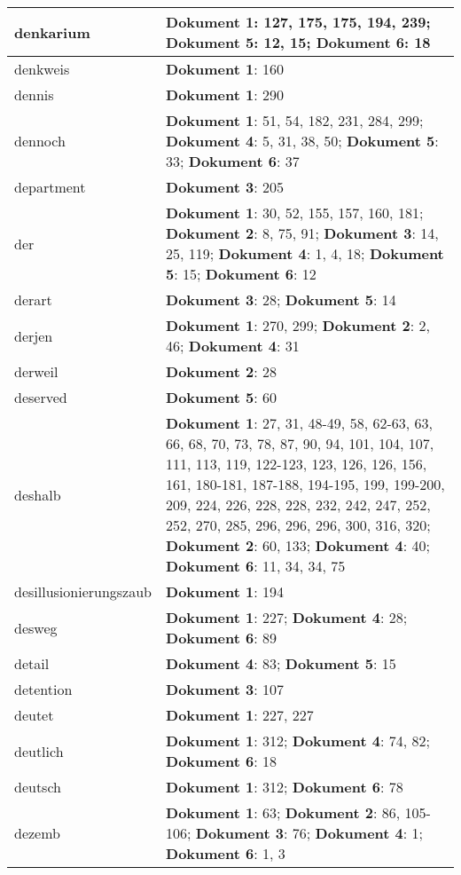 \documentclass[a5paper]{article}
\begin{document}
\begin{longtable}[l]{|l|p{3in}|}
\hline
denkarium & \textbf{Dokument 1}: 127, 175, 175, 194, 239; \textbf{Dokument 5}: 12, 15; \textbf{Dokument 6}: 18 \\
\hline
denkweis & \textbf{Dokument 1}: 160 \\
\hline
dennis & \textbf{Dokument 1}: 290 \\
\hline
dennoch & \textbf{Dokument 1}: 51, 54, 182, 231, 284, 299; \textbf{Dokument 4}: 5, 31, 38, 50; \textbf{Dokument 5}: 33; \textbf{Dokument 6}: 37 \\
\hline
department & \textbf{Dokument 3}: 205 \\
\hline
der & \textbf{Dokument 1}: 30, 52, 155, 157, 160, 181; \textbf{Dokument 2}: 8, 75, 91; \textbf{Dokument 3}: 14, 25, 119; \textbf{Dokument 4}: 1, 4, 18; \textbf{Dokument 5}: 15; \textbf{Dokument 6}: 12 \\
\hline
derart & \textbf{Dokument 3}: 28; \textbf{Dokument 5}: 14 \\
\hline
derjen & \textbf{Dokument 1}: 270, 299; \textbf{Dokument 2}: 2, 46; \textbf{Dokument 4}: 31 \\
\hline
derweil & \textbf{Dokument 2}: 28 \\
\hline
deserved & \textbf{Dokument 5}: 60 \\
\hline
deshalb & \textbf{Dokument 1}: 27, 31, 48-49, 58, 62-63, 63, 66, 68, 70, 73, 78, 87, 90, 94, 101, 104, 107, 111, 113, 119, 122-123, 123, 126, 126, 156, 161, 180-181, 187-188, 194-195, 199, 199-200, 209, 224, 226, 228, 228, 232, 242, 247, 252, 252, 270, 285, 296, 296, 296, 300, 316, 320; \textbf{Dokument 2}: 60, 133; \textbf{Dokument 4}: 40; \textbf{Dokument 6}: 11, 34, 34, 75 \\
\hline
desillusionierungszaub & \textbf{Dokument 1}: 194 \\
\hline
desweg & \textbf{Dokument 1}: 227; \textbf{Dokument 4}: 28; \textbf{Dokument 6}: 89 \\
\hline
detail & \textbf{Dokument 4}: 83; \textbf{Dokument 5}: 15 \\
\hline
detention & \textbf{Dokument 3}: 107 \\
\hline
deutet & \textbf{Dokument 1}: 227, 227 \\
\hline
deutlich & \textbf{Dokument 1}: 312; \textbf{Dokument 4}: 74, 82; \textbf{Dokument 6}: 18 \\
\hline
deutsch & \textbf{Dokument 1}: 312; \textbf{Dokument 6}: 78 \\
\hline
dezemb & \textbf{Dokument 1}: 63; \textbf{Dokument 2}: 86, 105-106; \textbf{Dokument 3}: 76; \textbf{Dokument 4}: 1; \textbf{Dokument 6}: 1, 3 \\

\end{longtable}
\end{document}
